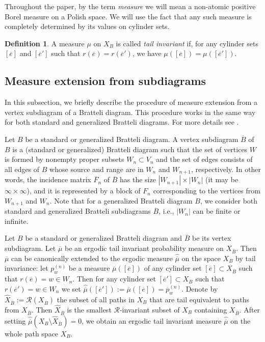 \documentclass[11pt, twoside]{amsart}
\theoremstyle{definition}
\newtheorem{definition}{Definition}[section]
\theoremstyle{remark}
\theoremstyle{plain}
\def\ol{\overline}
\def\ov{\overline}
\def\wh{\widehat}
\numberwithin{equation}{section}
\begin{document}
Throughout the paper, by the term \textit{measure} we will mean a
non-atomic positive Borel measure on a Polish space. We will use the 
fact that any such measure is completely determined by its values on cylinder sets. 

\begin{definition}\label{def: tail inv meas}  A measure $\mu$ on 
$X_B$ is called \textit{tail invariant} if, for any cylinder sets
$[\ol e]$ and $[\ol e']$ such that $r(\ol e) = r(\ol e')$, we have
$\mu([\ol e]) = \mu([\ol e'])$.
\end{definition}


\subsection{Measure extension from subdiagrams}

In this subsection, we briefly describe the procedure of measure extension from a vertex subdiagram of a Bratteli diagram. This procedure works in the same way for both standard and generalized Bratteli diagrams. For more details see \cite{BezuglyiKarpelKwiatkowski2015, AdamskaBezuglyiKarpelKwiatkowski2017, BezuglyiKarpelKwiatkowski2024}.

Let $B$ be a standard or generalized Bratteli diagram.
A vertex subdiagram $\ov B$ of $B$ is a (standard or generalized) Bratteli diagram such that the set of vertices $W$ is formed by nonempty proper subsets $W_n \subset V_n$ and the set of edges consists of all edges of $B$ whose source and range are in $W_{n}$ and $W_{n+1}$, respectively. In other words, the incidence matrix $\ol F_n$ of $\ol B$ has the size $|W_{n+1}| \times |W_n|$ (it may be $\infty \times \infty$), and it is represented by a block of $F_n$ corresponding to the vertices from $W_{n+1}$ and $W_{n}$.
Note that for a generalized Bratteli diagram $B$, we consider both standard and generalized Bratteli subdiagrams $\ol B$, i.e., $|W_n|$
can be finite or infinite.

Let $B$ be a standard or generalized Bratteli diagram and $\ov B$ be its vertex subdiagram. Let $\ov \mu$ be an ergodic tail invariant probability measure on $X_{\ol B}$. Then $\ol \mu$ can be canonically extended to the ergodic measure $\widehat{\ov \mu}$ on the space $X_{B}$ by tail invariance: let $p_w^{(n)}$ be a measure $\ov \mu([\ov e])$ of any cylinder set $[\ov e] \subset X_{\ov B}$ such that $r(\ov e) = w \in W_n$. Then for any cylinder set $[\ov e'] \subset X_{B}$ such that $r(\ov e') = w \in W_n$ we set $\wh {\ov \mu}([\ov e']) := {\ov \mu}([\ov e]) = \ov p_w^{(n)}$. Denote by $\widehat X_{\ol B}:= \mathcal R(X_{\ol B})$ the subset of all paths in $X_B$ that are tail equivalent to paths from $X_{\ol B}$. Then $\widehat X_{\ol B}$ is the smallest $\mathcal R$-invariant subset of $X_B$ containing $X_{\ol B}$. After setting $\wh {\ov \mu}(X_B \setminus \wh X_{\ov B}) = 0$, we obtain an ergodic tail invariant measure $\wh {\ov \mu}$ on the whole path space $X_B$.
\end{document}
